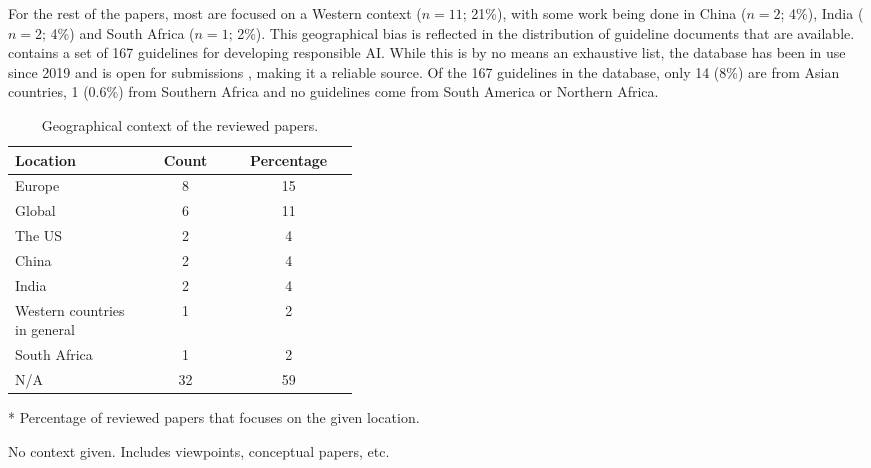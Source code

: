For the rest of the papers, most are focused on a Western context ($n = 11$; 21\%), with some work being done in China ($n = 2$; 4\%), India ($n = 2$; 4\%) and South Africa ($n = 1$; 2\%). This geographical bias is reflected in the distribution of guideline documents that are available.
\textcite{AlgorithmWatch} contains a set of 167 guidelines for developing responsible AI. While this is by no means an exhaustive list, the database has been in use since 2019 and is open for submissions \parencite{AlgorithmWatch_about}, making it a reliable source. Of the 167 guidelines in the database, only 14 (8\%) are from Asian countries, 1 (0.6\%) from Southern Africa and no guidelines come from South America or Northern Africa.

\begin{table}[htpb]
    \centering
    \caption{Geographical context of the reviewed papers.}
    \label{tab:summary-context}
    \begin{threeparttable}
    \begin{tabular}{p{0.4\linewidth}cc}
    \toprule
        \textbf{Location} & \textbf{Count} & \textbf{Percentage}\tnote{*} \\
    \midrule
        Europe                          & 8     & 15 \\ 
        Global                          & 6     & 11 \\ 
        The US                          & 2     & 4 \\
        China                           & 2     & 4 \\ 
        India                           & 2     & 4 \\ 
        Western countries in general    & 1     & 2 \\ 
        South Africa                    & 1     & 2 \\
        N/A\tnote{\textdagger}          & 32    & 59 \\ 
    \bottomrule
    \end{tabular}
    \begin{tablenotes}
        \footnotesize
        \item [*] Percentage of reviewed papers that focuses on the given location.
        \item [\textdagger] No context given. Includes viewpoints, conceptual papers, etc.
    \end{tablenotes}
\end{threeparttable}
\end{table}


